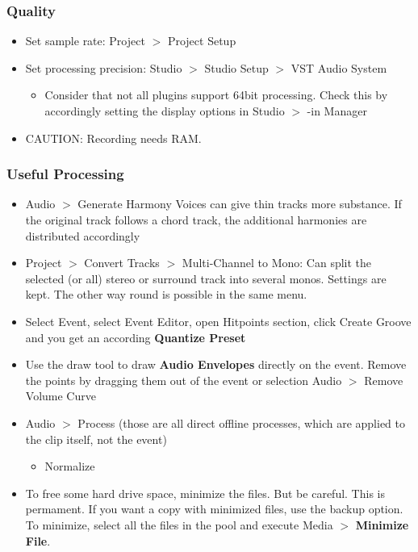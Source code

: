\documentclass[10pt]{article}
\begin{document}
\subsubsection{Quality}

\begin{itemize}
	\item Set sample rate: Project $>$ Project Setup
	\item Set processing precision: Studio $>$ Studio Setup $>$ VST Audio System
	\begin{itemize}
		\item Consider that not all plugins support 64bit processing. Check this by accordingly setting the display options in Studio $>$ -in Manager
	\end{itemize}
	\item CAUTION: Recording needs RAM. 
\end{itemize}

\subsubsection{Useful Processing}

\begin{itemize}
	\item Audio $>$ Generate Harmony Voices can give thin tracks more substance. If the original track follows a chord track, the additional harmonies are distributed accordingly
	\item Project $>$ Convert Tracks $>$ Multi-Channel to Mono: Can split the selected (or all) stereo or surround track into several monos. Settings are kept. The other way round is possible in the same menu.
	\item Select Event, select Event Editor, open Hitpoints section, click Create Groove and you get an according \textbf{Quantize Preset}
	\item Use the draw tool to draw \textbf{Audio Envelopes} directly on the event. Remove the points by dragging them out of the event or selection Audio $>$ Remove Volume Curve
	\item Audio $>$ Process (those are all direct offline processes, which are applied to the clip itself, not the event)
	\begin{itemize}
		\item Normalize
	\end{itemize}
	\item To free some hard drive space, minimize the files. But be careful. This is permament. If you want a copy with minimized files, use the backup option. To minimize, select all the files in the pool and execute Media $>$ \textbf{Minimize File}.
\end{itemize}
\end{document}
